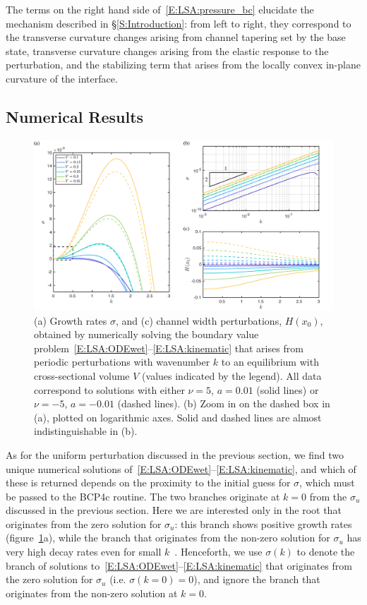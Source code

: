 \documentclass{jfm}
\begin{document}
The terms on the right hand side of~\eqref{E:LSA:pressure_bc} elucidate the mechanism described in \S\ref{S:Introduction}: from left to right, they correspond to the transverse curvature changes arising from channel tapering set by the base state, transverse curvature changes arising from the elastic response to the perturbation, and the stabilizing term that arises from the locally convex in-plane curvature of the interface.


\subsection{Numerical Results}

\begin{figure}
\centering
\includegraphics[width =\textwidth]{figures/fig6_growth_rates.pdf}
\caption{(a) Growth rates $\sigma$, and (c) channel width perturbations, $H(x_0)$, obtained by numerically solving the boundary value problem~\eqref{E:LSA:ODEwet}--\eqref{E:LSA:kinematic} that arises from periodic perturbations with wavenumber $k$ to an equilibrium with cross-sectional volume $V$ (values indicated by the legend). All data correspond to solutions with either $\nu = 5$, $a = 0.01$ (solid lines) or $\nu = -5$, $a = -0.01$ (dashed lines). (b) Zoom in on the dashed box in (a), plotted on logarithmic axes. Solid and dashed lines are almost indistinguishable in (b).}
\label{fig:LinearStability:GrowthRates}
\end{figure}


As for the uniform perturbation discussed in the previous section, we find two unique numerical solutions of~\eqref{E:LSA:ODEwet}--\eqref{E:LSA:kinematic}, and which of these is returned depends on the proximity to the initial guess for $\sigma$, which must be passed to the BCP4c routine. The two branches originate at $k=0$ from the $\sigma_u$ discussed in the previous section. Here we are interested only in the root that originates from the zero solution for $\sigma_u$: this branch shows positive growth rates (figure~\ref{fig:LinearStability:GrowthRates}a), while the branch that originates from the non-zero solution for $\sigma_u$ has very high decay rates even for small $k$~\citep[not shown, see Ch. 5 in][]{BradleyPhDthesis}. Henceforth, we use $\sigma(k)$ to denote the branch of solutions to~\eqref{E:LSA:ODEwet}--\eqref{E:LSA:kinematic} that originates from the zero solution for $\sigma_u$ (i.e. $\sigma(k=0) = 0$), and ignore the branch that originates from the non-zero solution at $k = 0$.
\end{document}
